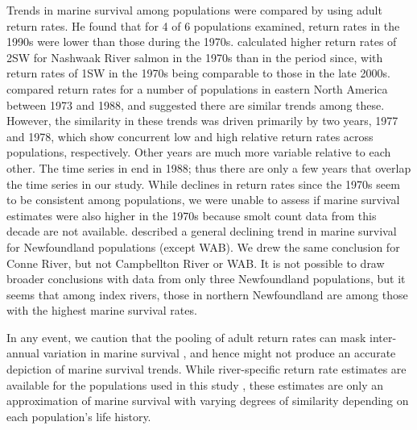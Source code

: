 \documentclass[12pt]{article}
\begin{document}
Trends in marine survival
among populations were compared by \citet{Chaput2012a} using adult return rates.
He found that for 4 of 6 populations examined, return rates in the 1990s
were lower than those during the 1970s.
\citet{Gibson2016} calculated higher return rates of 2SW for Nashwaak River salmon in
the 1970s than in the period since, with return rates of 1SW in the 1970s
being comparable to those in the late 2000s.
\citet{Friedland1993} compared return rates for a number of populations in eastern
North America between 1973 and 1988, and suggested there are similar trends among these.
However, the similarity in these trends was driven primarily by two years, 1977 and 1978, which
show concurrent low and high relative return rates across populations,
respectively. Other years are much more variable relative to each other.
The time series in \citet{Friedland1993} end in
1988; thus there are only a few years that overlap the
time series in our study.
While declines in return rates since the 1970s seem to be consistent among
populations, we were unable to assess if marine survival estimates were also
higher in the 1970s because smolt count data from this decade are not available.
\citet{Dempson2003} described a general declining trend in marine survival for
Newfoundland populations (except WAB). We drew the same conclusion for Conne
River, but not Campbellton River or WAB. It is not possible to draw broader
conclusions with data from only three Newfoundland populations, but it seems
that among index rivers, those in northern Newfoundland are among those with
the highest marine survival rates.

In any event, we caution that the pooling of adult return rates
\citep{Chaput2012a, Friedland1993,Gibson2016} can mask inter-annual
variation in marine survival \citep{Hubley2011}, and hence might not produce
an accurate depiction of marine survival trends.
While river-specific return rate estimates are available for the populations
used in this study \citep{ICES2019}, these estimates are only an approximation
of marine survival with varying degrees of similarity depending on each
population's life history.
\end{document}
